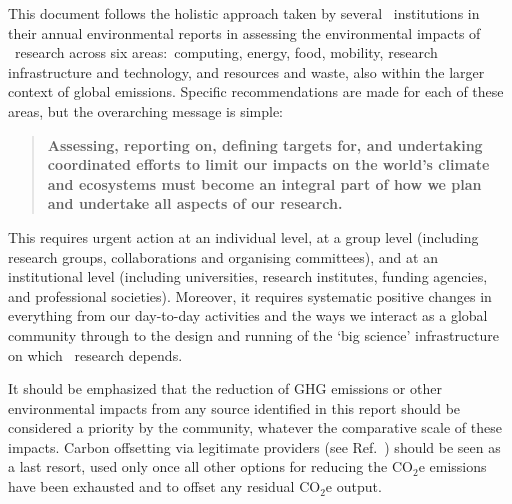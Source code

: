 \documentclass[../SustainableHEP.tex]{subfiles}
\begin{document}
This document follows the holistic approach taken by several \ACR\ institutions in their annual environmental reports in assessing the environmental impacts of \ACR\ research across six areas:\ computing, energy, food, mobility, research infrastructure and technology, and resources and waste, also within the larger context of global emissions. Specific recommendations are made for each of these areas, but the overarching message is simple:
\begin{quotation}
{\bfseries Assessing, reporting on, defining targets for, and undertaking coordinated efforts to limit our impacts on the world's climate and ecosystems must become an integral part of how we plan and undertake all aspects of our research.}
\end{quotation}
This requires urgent action at an individual level, at a group level (including research groups, collaborations and organising committees), and at an institutional level (including universities, research institutes, funding agencies, and professional societies). Moreover, it requires systematic positive changes in everything from our day-to-day activities and the ways we interact as a global community through to the design and running of the `big science' infrastructure on which \ACR\ research depends.

It should be emphasized that the reduction of GHG emissions or other environmental impacts from any source identified in this report should be considered a priority by the community, whatever the comparative scale of these impacts. Carbon offsetting via legitimate providers (see Ref.~\cite{Uni22}) should be seen as a last resort, used only once all other options for reducing the CO$_2$e emissions have been exhausted and to offset any residual CO$_2$e output.
\end{document}
